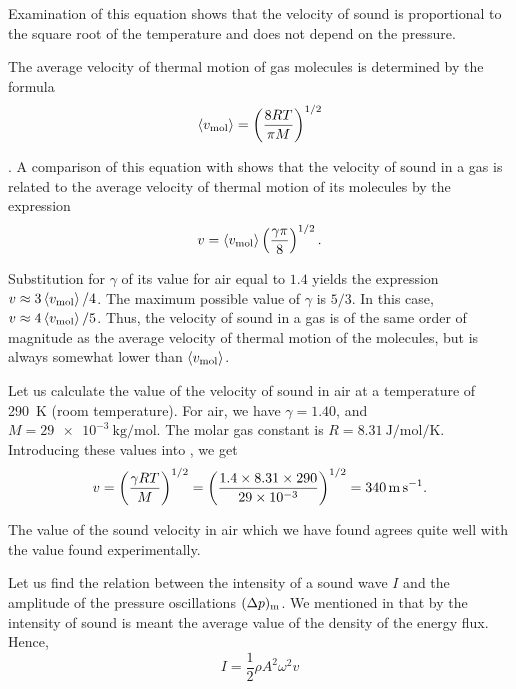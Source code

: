 \noindent
Examination of this equation shows that the velocity of sound is proportional to the square root of the temperature and does not depend on the pressure.

The average velocity of thermal motion of gas molecules is determined by the formula
\begin{equation*}
	\left\langle v_{\text{mol}} \right\rangle = \left(\frac{8RT}{\pi M}\right)^{1/2}
\end{equation*}

.
A comparison of this equation with  shows that the velocity of sound in a gas is related to the average velocity of thermal motion of its molecules by the expression
\begin{equation}\label{eq:14_71}
	v = \left\langle v_{\text{mol}} \right\rangle \left(\frac{\gamma\pi}{8}\right)^{1/2}.
\end{equation}

\noindent
Substitution for $\gamma$ of its value for air equal to $1.4$ yields the expression $v\approx 3\left\langle v_{\text{mol}} \right\rangle/4$.
The maximum possible value of $\gamma$ is $5/3$.
In this case, $v\approx 4\left\langle v_{\text{mol}} \right\rangle/5$.
Thus, the velocity of sound in a gas is of the same order of magnitude as the average velocity of thermal motion of the molecules, but is always somewhat lower than $\left\langle v_{\text{mol}} \right\rangle$.

Let us calculate the value of the velocity of sound in air at a temperature of \SI{290}{\kelvin} (room temperature).
For air, we have $\gamma=1.40$, and $M=\SI{29e-3}{\kilo\gram\per\mole}$.
The molar gas constant is $R=\SI{8.31}{\joule\per\mole\per\kelvin}$.
Introducing these values into , we get
\begin{equation*}
	v = \left(\frac{\gamma RT}{M}\right)^{1/2} = \left(\frac{1.4\times 8.31 \times 290}{\num{29e-3}}\right)^{1/2} = \SI{340}{\metre\per\second}.
\end{equation*}

\noindent
The value of the sound velocity in air which we have found agrees quite well with the value found experimentally.

Let us find the relation between the intensity of a sound wave $I$ and the amplitude of the pressure oscillations $(\Delta{p})_{\text{m}}$.
We mentioned in  that by the intensity of sound is meant the average value of the density of the energy flux.
Hence,
\begin{equation}\label{eq:14_72}
	I = \frac{1}{2} \rho A^2 \omega^2 v
\end{equation}

